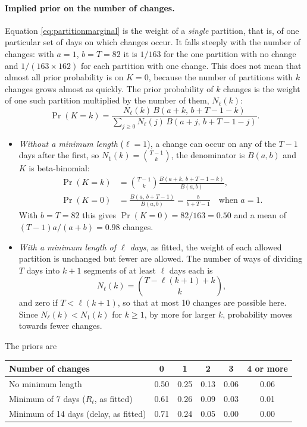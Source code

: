 \documentclass[11pt,a4paper]{article}
\begin{document}
\paragraph{Implied prior on the number of changes.} Equation
\eqref{eq:partitionmarginal} is the weight of a \emph{single} partition, that
is, of one particular set of days on which changes occur. It falls steeply
with the number of changes: with $a=1$, $b=T=82$ it is $1/163$ for the one
partition with no change and $1/(163\times 162)$ for each partition with one
change. This does not mean that almost all prior probability is on $K=0$,
because the number of partitions with $k$ changes grows almost as quickly. The
prior probability of $k$ changes is the weight of one such partition
multiplied by the number of them, $N_\ell(k)$:
\begin{equation}\label{eq:priorK}
\Pr(K=k)=\frac{N_\ell(k)\,B(a+k,\,b+T-1-k)}
{\sum_{j\ge 0}N_\ell(j)\,B(a+j,\,b+T-1-j)}.
\end{equation}
\begin{itemize}[itemsep=2pt]
\item \emph{Without a minimum length} ($\ell=1$), a change can occur on any of
the $T-1$ days after the first, so $N_1(k)=\binom{T-1}{k}$, the denominator
is $B(a,b)$ and $K$ is beta-binomial:
\begin{align}
\Pr(K=k)&=\binom{T-1}{k}\frac{B(a+k,\,b+T-1-k)}{B(a,b)}, \label{eq:betabinomial}\\
\Pr(K=0)&=\frac{B(a,\,b+T-1)}{B(a,b)}=\frac{b}{b+T-1}\quad\text{when } a=1.
\end{align}
With $b=T=82$ this gives $\Pr(K=0)=82/163=0.50$ and a mean of
$(T-1)a/(a+b)=0.98$ changes.
\item \emph{With a minimum length of $\ell$ days}, as fitted, the weight of
each allowed partition is unchanged but fewer are allowed. The number of ways
of dividing $T$ days into $k+1$ segments of at least $\ell$ days each is
\begin{equation}\label{eq:countvalid}
N_\ell(k)=\binom{T-\ell(k+1)+k}{k},
\end{equation}
and zero if $T<\ell(k+1)$, so that at most 10 changes are possible here. Since
$N_\ell(k)<N_1(k)$ for $k\ge 1$, by more for larger $k$, probability moves
towards fewer changes.
\end{itemize}
The priors are

\begin{center}
\begin{tabular}{lccccc}
\toprule
Number of changes & 0 & 1 & 2 & 3 & 4 or more \\
\midrule
No minimum length & 0.50 & 0.25 & 0.13 & 0.06 & 0.06 \\
Minimum of 7 days ($R_t$, as fitted) & 0.61 & 0.26 & 0.09 & 0.03 & 0.01 \\
Minimum of 14 days (delay, as fitted) & 0.71 & 0.24 & 0.05 & 0.00 & 0.00 \\
\bottomrule
\end{tabular}
\end{center}
\end{document}
